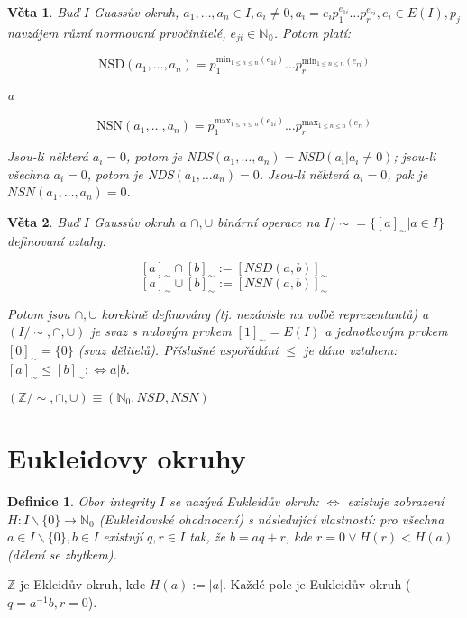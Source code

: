 \documentclass[a4paper, 11pt]{report}
\newtheorem{mydef}{Definice}[chapter]
\newtheorem{veta}{Věta}
\begin{document}
\begin{veta}
Buď $I$ Guassův okruh, $a_1, \dots, a_n \in I, a_i \not= 0, a_i = e_i p_1^{e_{1i}} \dots p_r^{e_{ri}}, e_i \in E(I), p_j$ navzájem různí normovaní prvočinitelé, $e_{ji} \in \mathbb{N_0}$. Potom platí:

$$ \text{NSD}(a_1, \dots, a_n) = p_1^{\text{min}_{1 \leq n \leq n}(e_{1i})} \dots p_r^{\text{min}_{1 \leq n \leq n}(e_{ri})}$$

a

$$ \text{NSN}(a_1, \dots, a_n) = p_1^{\text{max}_{1 \leq n \leq n}(e_{1i})} \dots p_r^{\text{max}_{1 \leq n \leq n}(e_{ri})}$$

Jsou-li některá $a_i = 0$, potom je NDS$(a_1, \dots, a_n) = $NSD$(a_i|a_i \not= 0)$; jsou-li všechna $a_i = 0$, potom je NDS$(a_1, \dots a_n) = 0$. Jsou-li některá $a_i = 0$, pak je $NSN(a_1, \dots, a_n) = 0$.
\end{veta}

\begin{veta}
Buď $I$ Gaussův okruh a $\cap, \cup$ binární operace na $I / \sim= \{[a]_\sim | a \in I\}$ definovaní vztahy:

$$[a]_\sim \cap [b]_\sim := [NSD(a, b)]_\sim $$
$$[a]_\sim \cup [b]_\sim := [NSN(a, b)]_\sim $$

Potom jsou $\cap, \cup$ korektně definovány (tj. nezávisle na volbě reprezentantů) a $(I / \sim, \cap, \cup)$ je svaz s nulovým prvkem $[1]_\sim = E(I)$ a jednotkovým prvkem $[0]_\sim = \{0\}$ (svaz dělitelů). Příslušné uspořádání $\leq$ je dáno vztahem: $[a]_\sim \leq [b]_\sim : \Leftrightarrow a|b$.
\end{veta}

$(\mathbb{Z}/ \sim, \cap, \cup) \equiv (\mathbb{N}_0, NSD, NSN)$

\section{Eukleidovy okruhy}
\begin{mydef}
Obor integrity $I$ se nazývá Eukleidův okruh: $\Leftrightarrow$ existuje zobrazení $H: I \backslash \{0\} \to \mathbb{N}_0$ (Eukleidovské ohodnocení) s následující vlastností: pro všechna $a \in I \backslash \{0\}, b \in I$ existují $q, r \in I$ tak, že $b=aq + r$, kde $r = 0 \lor H(r) < H(a)$ (dělení se zbytkem).
\end{mydef}

$\mathbb{Z}$ je Ekleidův okruh, kde $H(a) := |a|$. Každé pole je Eukleidův okruh ($q = a^{-1}b, r = 0$).
\end{document}

